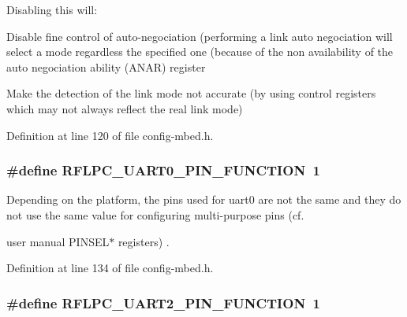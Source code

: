 Disabling this will\-:


\begin{DoxyItemize}
\item Disable fine control of auto-\/negociation (performing a link auto negociation will select a mode regardless the specified one (because of the non availability of the auto negociation ability (A\-N\-A\-R) register
\end{DoxyItemize}


\begin{DoxyItemize}
\item Make the detection of the link mode not accurate (by using control registers which may not always reflect the real link mode) 
\end{DoxyItemize}

Definition at line 120 of file config-\/mbed.\-h.

\hypertarget{group__config_ga16df9509883b14d96ddf30f831a0fae5}{
\subsubsection[{R\-F\-L\-P\-C\-\_\-\-U\-A\-R\-T0\-\_\-\-P\-I\-N\-\_\-\-F\-U\-N\-C\-T\-I\-O\-N}]{\setlength{\rightskip}{0pt plus 5cm}\#define {\bf R\-F\-L\-P\-C\-\_\-\-U\-A\-R\-T0\-\_\-\-P\-I\-N\-\_\-\-F\-U\-N\-C\-T\-I\-O\-N}~1}}\label{group__config_ga16df9509883b14d96ddf30f831a0fae5}


Depending on the platform, the pins used for uart0 are not the same and they do not use the same value for configuring multi-\/purpose pins (cf. 

user manual P\-I\-N\-S\-E\-L$\ast$ registers) . 

Definition at line 134 of file config-\/mbed.\-h.

\hypertarget{group__config_ga407dd3739a66a95a6252951ec28b7ae0}{
\subsubsection[{R\-F\-L\-P\-C\-\_\-\-U\-A\-R\-T2\-\_\-\-P\-I\-N\-\_\-\-F\-U\-N\-C\-T\-I\-O\-N}]{\setlength{\rightskip}{0pt plus 5cm}\#define {\bf R\-F\-L\-P\-C\-\_\-\-U\-A\-R\-T2\-\_\-\-P\-I\-N\-\_\-\-F\-U\-N\-C\-T\-I\-O\-N}~1}}\label{group__config_ga407dd3739a66a95a6252951ec28b7ae0}


